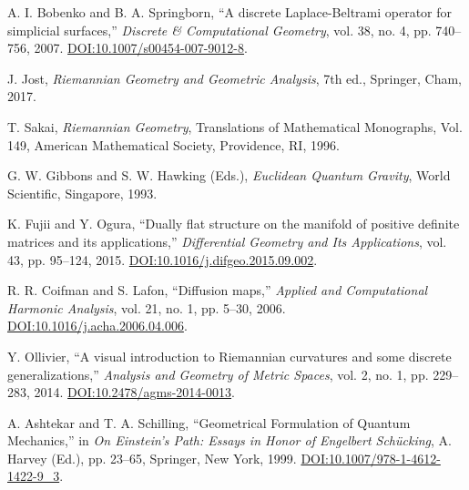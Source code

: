 \documentclass[twoside,twocolumn]{article}
\numberwithin{equation}{section} %
\begin{document}
\begin{thebibliography}{99}
A. I. Bobenko and B. A. Springborn,
``A discrete Laplace-Beltrami operator for simplicial surfaces,''
\textit{Discrete \& Computational Geometry}, vol. 38, no. 4, pp. 740--756, 2007. %
\href{https://doi.org/10.1007/s00454-007-9012-8}{DOI:10.1007/s00454-007-9012-8}.


J. Jost,
\textit{Riemannian Geometry and Geometric Analysis},
7th ed., Springer, Cham, 2017. %

T. Sakai,
\textit{Riemannian Geometry},
Translations of Mathematical Monographs, Vol. 149, American Mathematical Society, Providence, RI, 1996.

G. W. Gibbons and S. W. Hawking (Eds.), %
\textit{Euclidean Quantum Gravity},
World Scientific, Singapore, 1993.

K. Fujii and Y. Ogura,
``Dually flat structure on the manifold of positive definite matrices and its applications,''
\textit{Differential Geometry and Its Applications}, vol. 43, pp. 95--124, 2015.
\href{https://doi.org/10.1016/j.difgeo.2015.09.002}{DOI:10.1016/j.difgeo.2015.09.002}.

R. R. Coifman and S. Lafon,
``Diffusion maps,''
\textit{Applied and Computational Harmonic Analysis}, vol. 21, no. 1, pp. 5--30, 2006.
\href{https://doi.org/10.1016/j.acha.2006.04.006}{DOI:10.1016/j.acha.2006.04.006}.

Y. Ollivier,
``A visual introduction to Riemannian curvatures and some discrete generalizations,''
\textit{Analysis and Geometry of Metric Spaces}, vol. 2, no. 1, pp. 229--283, 2014. %
\href{https://doi.org/10.2478/agms-2014-0013}{DOI:10.2478/agms-2014-0013}.

A. Ashtekar and T. A. Schilling,
``Geometrical Formulation of Quantum Mechanics,''
in \textit{On Einstein's Path: Essays in Honor of Engelbert Sch\"ucking}, A. Harvey (Ed.), pp. 23--65, Springer, New York, 1999. %
\href{https://doi.org/10.1007/978-1-4612-1422-9_3}{DOI:10.1007/978-1-4612-1422-9\_3}. %



\end{thebibliography}
\end{document}
